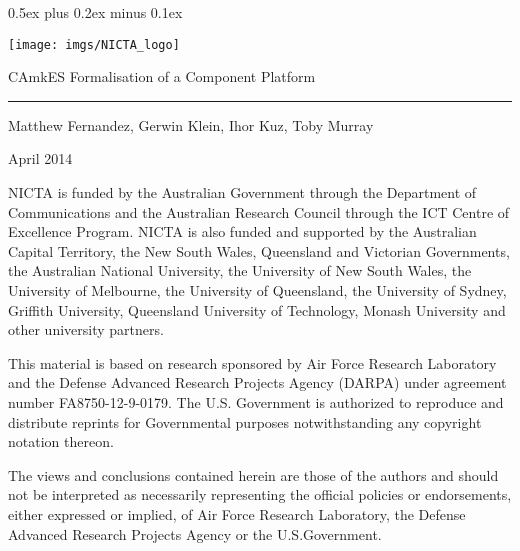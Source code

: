 \documentclass[11pt,a4paper]{scrreprt}
\date{\small\today}
\date{}
\newcommand{\titl}{CAmkES Formalisation of a Component Platform}
\newcommand{\authors}{Matthew Fernandez, Gerwin Klein, Ihor Kuz, Toby Murray}
\newcommand{\nictafundingacknowledgement}{%
NICTA is funded by the Australian Government through the Department of Communications and the Australian Research Council through the ICT Centre of Excellence Program. NICTA is also funded and supported by the Australian Capital Territory, the New South Wales, Queensland and Victorian Governments, the Australian National University, the University of New South Wales, the University of Melbourne, the University of Queensland, the University of Sydney, Griffith University, Queensland University of Technology, Monash University and other university partners.}
\newcommand{\trdisclaimer}{%
This material is based on research sponsored by Air Force Research Laboratory
and the Defense Advanced Research Projects Agency (DARPA) under agreement number
FA8750-12-9-0179. The U.S. Government is authorized to reproduce and distribute
reprints for Governmental purposes notwithstanding any copyright notation
thereon.

The views and conclusions contained herein are those of the authors and should
not be interpreted as necessarily representing the official policies or
endorsements, either expressed or implied, of Air Force Research Laboratory,
the Defense Advanced Research Projects Agency or the U.S.Government.}
\newcommand{\bigdisclaimer}{%
\nictafundingacknowledgement

\vspace{2ex}
\trdisclaimer}
\begin{document}
\parindent 0pt\parskip 0.5ex plus 0.2ex minus 0.1ex


\begin{center}
 \texttt{[image: imgs/NICTA\_logo]}
\end{center}
	
\vspace{14ex}
\textsf{\huge \titl}


\vspace{4ex}
\rule{0.85\textwidth}{5pt}
\vspace{4ex}
  
{\large \authors 

\vspace{2ex}
April 2014}

\vfill
{\small
\bigdisclaimer
}

\thispagestyle{empty}
\newpage

\tableofcontents





\renewcommand{\refname}{}
\nocite{*}

\end{document}
